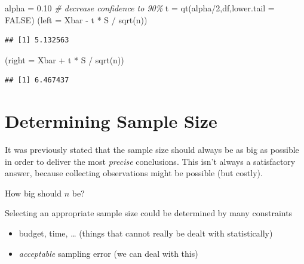 \documentclass[
]{book}
\newenvironment{Shaded}{\begin{snugshade}}{\end{snugshade}}
\newcommand{\AttributeTok}[1]{\textcolor[rgb]{0.77,0.63,0.00}{#1}}
\newcommand{\CommentTok}[1]{\textcolor[rgb]{0.56,0.35,0.01}{\textit{#1}}}
\newcommand{\ConstantTok}[1]{\textcolor[rgb]{0.00,0.00,0.00}{#1}}
\newcommand{\DecValTok}[1]{\textcolor[rgb]{0.00,0.00,0.81}{#1}}
\newcommand{\FloatTok}[1]{\textcolor[rgb]{0.00,0.00,0.81}{#1}}
\newcommand{\FunctionTok}[1]{\textcolor[rgb]{0.00,0.00,0.00}{#1}}
\newcommand{\NormalTok}[1]{#1}
\newcommand{\OtherTok}[1]{\textcolor[rgb]{0.56,0.35,0.01}{#1}}
\newcommand{\SpecialCharTok}[1]{\textcolor[rgb]{0.00,0.00,0.00}{#1}}
\begin{document}
\begin{Shaded}
\begin{Highlighting}[]
\NormalTok{alpha }\OtherTok{=} \FloatTok{0.10} \CommentTok{\# decrease confidence to 90\%}
\NormalTok{t }\OtherTok{=} \FunctionTok{qt}\NormalTok{(alpha}\SpecialCharTok{/}\DecValTok{2}\NormalTok{,df,}\AttributeTok{lower.tail =} \ConstantTok{FALSE}\NormalTok{)}
\NormalTok{(}\AttributeTok{left =}\NormalTok{ Xbar }\SpecialCharTok{{-}}\NormalTok{ t }\SpecialCharTok{*}\NormalTok{ S }\SpecialCharTok{/} \FunctionTok{sqrt}\NormalTok{(n))}
\end{Highlighting}
\end{Shaded}

\begin{verbatim}
## [1] 5.132563
\end{verbatim}

\begin{Shaded}
\begin{Highlighting}[]
\NormalTok{(}\AttributeTok{right =}\NormalTok{ Xbar }\SpecialCharTok{+}\NormalTok{ t }\SpecialCharTok{*}\NormalTok{ S }\SpecialCharTok{/} \FunctionTok{sqrt}\NormalTok{(n))}
\end{Highlighting}
\end{Shaded}

\begin{verbatim}
## [1] 6.467437
\end{verbatim}

\hypertarget{determining-sample-size}{%
\section{Determining Sample Size}\label{determining-sample-size}}

It was previously stated that the sample size should always be as big as possible in order to deliver the most \emph{precise} conclusions. This isn't always a satisfactory answer, because collecting observations might be possible (but costly).

How big should \(n\) be?

Selecting an appropriate sample size could be determined by many constraints

\begin{itemize}
\item
  budget, time, \ldots{} (things that cannot really be dealt with statistically)
\item
  \emph{acceptable} sampling error (we can deal with this)
\end{itemize}
\end{document}
